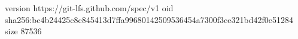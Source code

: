 version https://git-lfs.github.com/spec/v1
oid sha256:bc4b24425c8c845413d7ffa99680142509536454a7300f3ce321bd42f0e51284
size 87536
